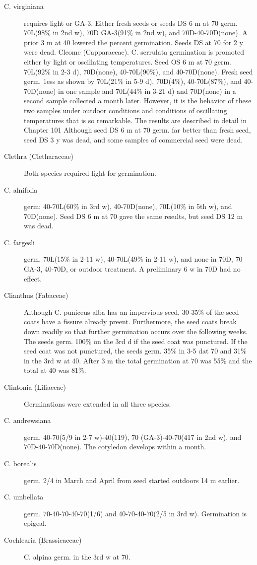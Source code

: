 \begin{description}
\item [C. virginiana] requires light or GA-3. Either fresh seeds or seeds DS 6 m at 70
germ. 70L(98\% in 2nd w), 70D GA-3(91\% in 2nd w), and 70D-40-70D(none). A prior 3
m at 40 lowered the percent germination. Seeds DS at 70 for 2 y were dead.
Cleome (Capparaceae). C. serrulata germination is promoted either by
light or oscillating temperatures. Seed OS 6 m at 70 germ. 70L(92\% in 2-3 d),
70D(none), 40-70L(90\%), and 40-70D(none). Fresh seed germ. 1ess as shown by
70L(21\% in 5-9 d), 70D(4\%), 40-70L(87\%), and 40-70D(none) in one sample and
70L(44\% in 3-21 d) and 70D(none) in a second sample collected a month later.
However, it is the behavior of these two samples under outdoor conditions and
conditions of oscillating temperatures that is so remarkable. The results are described
in detail in Chapter 101 Although seed DS 6 m at 70 germ. far better than fresh seed,
seed DS 3 y was dead, and some samples of commercial seed were dead.
\item [Clethra (Cletharaceae)] Both species required light for germination.
\item [C. alnifolia] germ: 40-70L(60\% in 3rd w), 40-70D(none), 70L(10\% in 5th w), and
70D(none). Seed DS 6 m at 70 gave the same results, but seed DS 12 m was dead.
\item [C. fargesli] germ. 70L(15\% in 2-11 w), 40-70L(49\% in 2-11 w), and none in
70D, 70 GA-3, 40-70D, or outdoor treatment. A preliminary 6 w in 70D had no effect.
\item [Clianthus (Fabaceae)] Although C. puniceus alba has an impervious seed,
30-35\% of the seed coats have a fissure already preent. Furthermore, the seed coats
break down readily so that further germination occurs over the following weeks. The
seeds germ. 100\% on the 3rd d if the seed coat was punctured. If the seed coat was
not punctured, the seeds germ. 35\% in 3-5 dat 70 and 31\% in the 3rd w at 40. After 3
m the total germination at 70 was 55\% and the total at 40 was 81\%.

\item [Clintonia (Liliaceae)] Germinations were extended in all three species.
\item [C. andrewsiana] germ. 40-70(5/9 in 2-7 w)-40(119), 70 (GA-3)-40-70(417 in 2nd
w), and 70D-40-70D(none). The cotyledon develops within a month.
\item [C. borealis] germ. 2/4 in March and April from seed started outdoors 14 m
earlier.
\item [C. umbellata] germ. 70-40-70-40-70(1/6) and 40-70-40-70(2/5 in 3rd w).
Germination is epigeal.
\item [Cochlearia (Brassicaceae)] C. alpina germ. in the 3rd w at 70.


\end{description}
